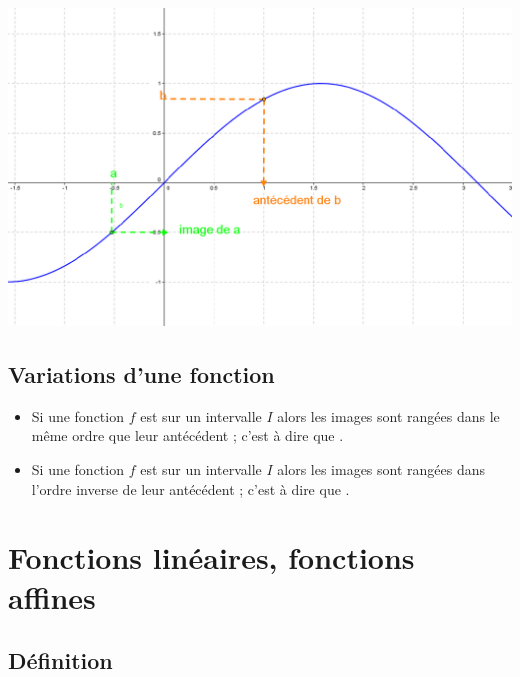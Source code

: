 \documentclass[12pt,a4paper]{article}
\begin{document}
	\begin{center}
		 \includegraphics[scale=0.5]{./img/voc}
	\end{center}
	
	
	\subsection{Variations d'une fonction}
	
	\begin{mydefs}
		
		\begin{itemize}
			\item Si une fonction $f$ est  sur un intervalle $I$ alors les images sont rangées dans le même ordre que leur antécédent ; c'est à dire que .
			\item Si une fonction $f$ est  sur un intervalle $I$ alors les images sont rangées dans l'ordre inverse de leur antécédent ; c'est à dire que .
		\end{itemize}
		
		
	\end{mydefs}
	
	\newpage 
	
	\section{Fonctions linéaires, fonctions affines}
	
	\subsection{Définition}
	
\end{document}
